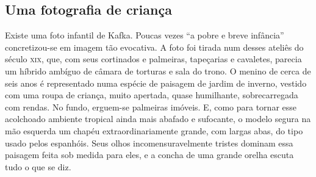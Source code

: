 \subsection{Uma fotografia de criança}

Existe uma foto infantil de Kafka. Poucas vezes ``a pobre e breve
infância'' concretizou-se em imagem tão evocativa. A foto foi tirada num
desses ateliês do século \textsc{xix}, que, com seus cortinados e palmeiras,
tapeçarias e cavaletes, parecia um híbrido ambíguo de câmara de torturas
e sala do trono. O menino de cerca de seis anos é representado numa
espécie de paisagem de jardim de inverno, vestido com uma roupa de
criança, muito apertada, quase humilhante, sobrecarregada com rendas. No
fundo, erguem-se palmeiras imóveis. E, como para tornar esse acolchoado
ambiente tropical ainda mais abafado e sufocante, o modelo segura na mão
esquerda um chapéu extraordinariamente grande, com largas abas, do tipo
usado pelos espanhóis. Seus olhos incomensuravelmente tristes dominam
essa paisagem feita sob medida para eles, e a concha de uma grande
orelha escuta tudo o que se diz.

